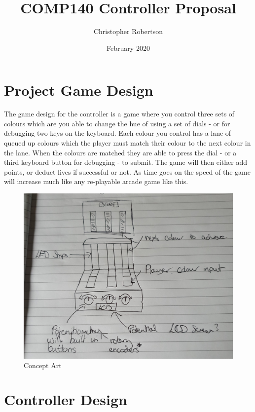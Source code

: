 \documentclass{article}
\title{COMP140 Controller Proposal}
\author{Christopher Robertson}
\date{February 2020}
\begin{document}
\maketitle
\newpage

\section{Project Game Design}

The game design for the controller is a game where you control three sets of colours which are you able to change the hue of using a set of dials - or for debugging two keys on the keyboard. Each colour you control has a lane of queued up colours which the player must match their colour to the next colour in the lane. When the colours are matched they are able to press the dial - or a third keyboard button for debugging - to submit. The game will then either add points, or deduct lives if successful or not. As time goes on the speed of the game will increase much like any re-playable arcade game like this.

\begin{figure}[ht]
  \includegraphics[width=\textwidth,height=\textheight,keepaspectratio]{controller_concept.jpg}
  \caption{Concept Art}
  \label{fig:Concept}
\end{figure}

\section{Controller Design}
\end{document}
